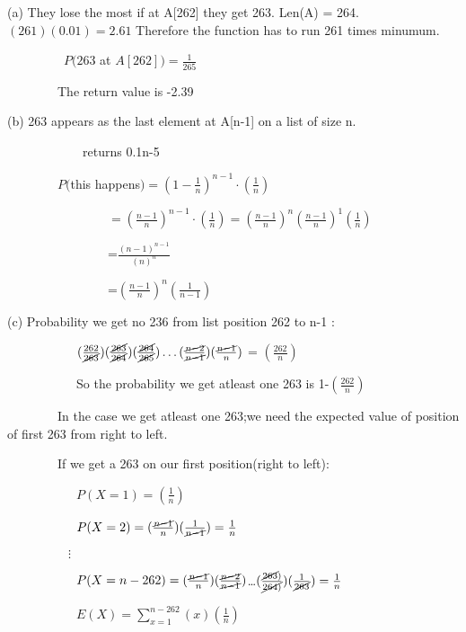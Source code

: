 \documentclass{assignment-263}
\begin{document}
\vskip 5pt
 		(a) They lose the most if at A[262] they get 263. Len(A) = 264. $(261)(0.01) = 2.61$ Therefore the function has to run 261 times minumum.

			
\ \ \ \ \ \ \ \ \  $ P(263$ at $A[262]) = \frac{1}{265}$

\ \ \ \ \ \ \ \ The return value is -2.39

\vskip 5pt
 		(b) 263 appears as the last element at A[n-1] on a list of size n.

\ \ \ \ \ \ \ \ \ \ \ \  returns 0.1n-5

\ \ \ \ \ \ \ \  $P($this happens$) = (1-\frac{1}{n})^{n-1}\cdot(\frac{1}{n})$

\ \ \ \ \ \ \ \ \ \ \ \ \ \ \ \ $= (\frac{n-1}{n})^{n-1}\cdot(\frac{1}{n}) =  (\frac{n-1}{n})^{n}(\frac{n-1}{n})^{1}(\frac{1}{n})$

\ \ \ \ \ \ \ \ \ \ \ \ \ \ \ \ =$  \frac{(n-1)^{n-1}}{(n)^n}$

\ \ \ \ \ \ \ \ \ \ \ \ \ \ \ \ =$  (\frac{n-1}{n})^{n}(\frac{1}{n-1})$



\vskip 5pt
 		(c) Probability we get no 236 from list position 262 to n-1 :

\ \ \ \ \ \ \ \ \ \ \ $( \frac{{262}}{\cancel{263}})( \frac{\cancel{263}}{\cancel{264}})( \frac{\cancel{264}}{\cancel{265}}) \dots ( \frac{\cancel{n-2}}{\cancel{n-1}})(\frac{\cancel{n-1}}{{n}})$ = $( \frac{{262}}{{n}})$

\ \ \ \ \  \ \ \ \ \ \ So the probability we get atleast one 263 is 1-$( \frac{{262}}{{n}})$

\ \ \ \ \ \ \ \ In the case we get atleast one 263;we need the expected value of position of first 263 from right to left.

\ \ \ \ \ \ \ \ If we get a 263 on our first position(right to left):

\ \ \ \ \ \ \ \ \ \ \  $P(X= 1) =  ( \frac{{1}}{{n}}) $

\ \ \ \ \ \ \ \ \ \ \  $P(X=2) = (\frac{\cancel{n-1}}{n})(\frac{{1}}{\cancel{n-1}})= \frac{1}{n}$

$\ \ \ \ \ \ \ \ \ \ \ \ \ \ \ \ \ \ \ \ \ \ \vdots$

\ \ \ \ \ \ \ \ \ \ \  $P(X= n-262) = (\frac{\cancel{n-1}}{n})(\frac{\cancel{n-2}}{\cancel{n-1}})$\dots$( \frac{\cancel{263})}{\cancel{264)}})(\frac{1}{\cancel{263}})= \frac{1}{n}$

\ \ \ \ \ \ \ \ \ \ \ $E(X) = \sum_{x=1}^{n-262} (x)(\frac{1}{n}) $
\end{document}

